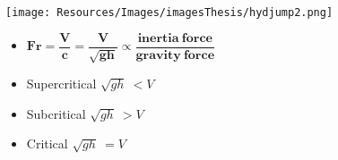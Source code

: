 \clearpage


\begin{frame}
\begin{minipage}{0.5\textwidth}
\vspace{1cm}
\texttt{[image: Resources/Images/imagesThesis/hydjump2.png]}
\end{minipage}
\hspace{1cm}
\begin{minipage}{0.4\textwidth}
\vspace{1.5cm}
\begin{tcolorbox}[colback=white] 
\begin{itemize}
\setlength{\itemsep}{1cm}
\item[] $\mathbf{Fr = \dfrac{V}{c} =\dfrac{V}{\sqrt{gh}} \propto \dfrac{inertia\ force}{gravity\ force}}$
\item Supercritical $\sqrt{gh}\ < V$
\item Subcritical $\sqrt{gh}\ > V$
\item Critical $\sqrt{gh}\  =  V$
\end{itemize}
\end{tcolorbox}
\end{minipage}
\end{frame}
